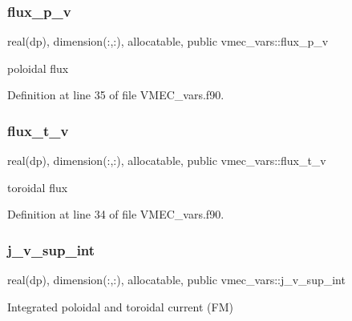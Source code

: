 \mbox{\label{namespacevmec__vars_aeac5e1262f419b7ae674586f576dc928}} 
\subsubsection{\texorpdfstring{flux\+\_\+p\+\_\+v}{flux\_p\_v}}
{\footnotesize\ttfamily real(dp), dimension(\+:,\+:), allocatable, public vmec\+\_\+vars\+::flux\+\_\+p\+\_\+v}



poloidal flux 



Definition at line 35 of file V\+M\+E\+C\+\_\+vars.\+f90.

\mbox{\label{namespacevmec__vars_ac246a5937702b1ac4c7f9bd92d286766}} 
\subsubsection{\texorpdfstring{flux\+\_\+t\+\_\+v}{flux\_t\_v}}
{\footnotesize\ttfamily real(dp), dimension(\+:,\+:), allocatable, public vmec\+\_\+vars\+::flux\+\_\+t\+\_\+v}



toroidal flux 



Definition at line 34 of file V\+M\+E\+C\+\_\+vars.\+f90.

\mbox{\label{namespacevmec__vars_aa822a336e5823876fea884b07857389c}} 
\subsubsection{\texorpdfstring{j\+\_\+v\+\_\+sup\+\_\+int}{j\_v\_sup\_int}}
{\footnotesize\ttfamily real(dp), dimension(\+:,\+:), allocatable, public vmec\+\_\+vars\+::j\+\_\+v\+\_\+sup\+\_\+int}



Integrated poloidal and toroidal current (FM) 

